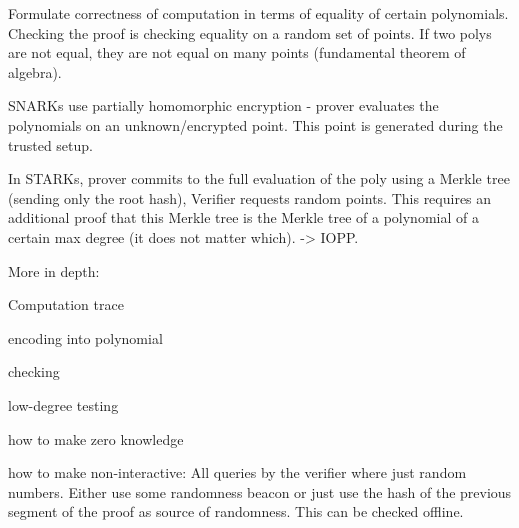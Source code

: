 \documentclass[11pt,letterpaper]{article}
\begin{document}
Formulate correctness of computation in terms of equality of certain polynomials.
Checking the proof is checking equality on a random set of points. If two polys are not equal, they
are not equal on many points (fundamental theorem of algebra).

SNARKs use partially homomorphic encryption - prover evaluates the polynomials on an unknown/encrypted point.
This point is generated during the trusted setup.

In STARKs, prover commits to the full evaluation of the poly using a Merkle tree (sending only the root hash),
Verifier requests random points. This requires an additional proof that this Merkle tree is the
Merkle tree of a polynomial of a certain max degree (it does not matter which). -> IOPP.

More in depth:

Computation trace

encoding into polynomial

checking

low-degree testing

how to make zero knowledge

how to make non-interactive:
All queries by the verifier where just random numbers. Either use some randomness beacon
or just use the hash of the previous segment of the proof as source of randomness. This can be checked
offline.
\end{document}
